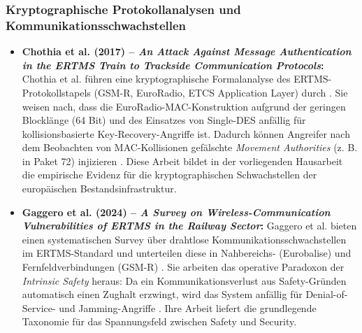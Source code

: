 \documentclass[runningheads]{res/llncs}
\begin{document}
\subsubsection{Kryptographische Protokollanalysen und Kommunikationsschwachstellen}
\begin{itemize}
    \item \textbf{Chothia et al. (2017) -- \textit{An Attack Against Message Authentication in the ERTMS Train to Trackside Communication Protocols}:}
    Chothia et al. führen eine kryptographische Formalanalyse des ERTMS-Protokollstapels (GSM-R, EuroRadio, ETCS Application Layer) durch \parencite[S. 743--756]{chothiaAttack2017}. Sie weisen nach, dass die EuroRadio-MAC-Konstruktion aufgrund der geringen Blocklänge (64 Bit) und des Einsatzes von Single-DES anfällig für kollisionsbasierte Key-Recovery-Angriffe ist. Dadurch können Angreifer nach dem Beobachten von MAC-Kollisionen gefälschte \textit{Movement Authorities} (z. B. in Paket 72) injizieren \parencite[S. 751--754]{chothiaAttack2017}. Diese Arbeit bildet in der vorliegenden Hausarbeit die empirische Evidenz für die kryptographischen Schwachstellen der europäischen Bestandsinfrastruktur.

    \item \textbf{Gaggero et al. (2024) -- \textit{A Survey on Wireless-Communication Vulnerabilities of ERTMS in the Railway Sector}:}
    Gaggero et al. bieten einen systematischen Survey über drahtlose Kommunikationsschwachstellen im ERTMS-Standard und unterteilen diese in Nahbereichs- (Eurobalise) und Fernfeldverbindungen (GSM-R) \parencite[S. 52--61]{gaggeroSurvey2024}. Sie arbeiten das operative Paradoxon der \textit{Intrinsic Safety} heraus: Da ein Kommunikationsverlust aus Safety-Gründen automatisch einen Zughalt erzwingt, wird das System anfällig für Denial-of-Service- und Jamming-Angriffe \parencite[S. 56--59]{gaggeroSurvey2024}. Ihre Arbeit liefert die grundlegende Taxonomie für das Spannungsfeld zwischen Safety und Security.
\end{itemize}
\end{document}
